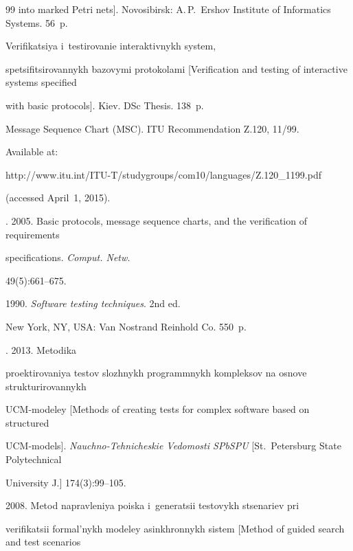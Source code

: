 {{\begin{thebibliography}{99}
into marked Petri nets]. Novosibirsk: A.\,P.~Ershov Institute of Informatics Systems. 56~p.


   Verifikatsiya i~testirovanie interaktivnykh system,

spetsifitsirovannykh bazovymi protokolami [Verification and testing of interactive systems specified

with basic protocols]. Kiev. DSc Thesis. 138~p.


  Message Sequence Chart (MSC). ITU Recommendation Z.120, 11/99.

  Available at: {\sf

http://www.itu.int/ITU-T/studygroups/com10/languages/Z.120\_1199.pdf}

(accessed April~1, 2015).


  . 2005. Basic protocols, message sequence charts, and the verification of requirements

specifications. \textit{Comput. Netw.}

  49(5):661--675.


   1990. \textit{Software testing techniques}. 2nd ed.

  New York, NY, USA: Van Nostrand Reinhold Co. 550~p.


  . 2013. Metodika

proektirovaniya testov slozhnykh programmnykh kompleksov na osnove strukturirovannykh

  UCM-modeley [Methods of creating tests for complex software based on structured

  UCM-models]. \textit{Nauchno-Tehnicheskie Vedomosti SPbSPU} [St.\ Petersburg State Polytechnical

University J.] 174(3):99--105.


   2008. Metod napravleniya poiska i~generatsii testovykh stsenariev pri

verifikatsii formal'nykh modeley asinkhronnykh sistem [Method of guided search and test scenarios


\end{thebibliography}}}
